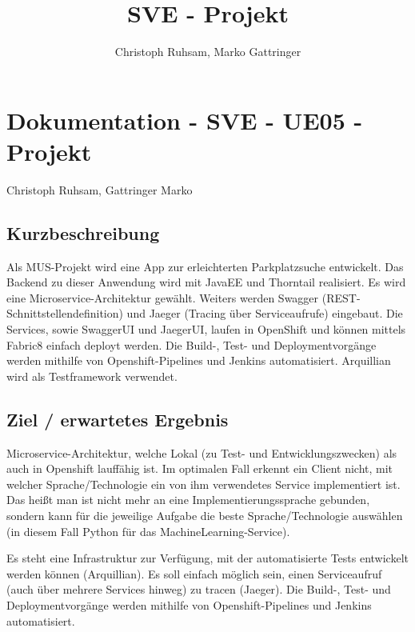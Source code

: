\documentclass[11pt, a4paper, twoside]{article}   	%
\title{SVE - Projekt}
\author{Christoph Ruhsam, Marko Gattringer}
\begin{document}
\setlength{\headheight}{15mm}

\section{Dokumentation - SVE - UE05 - Projekt}
Christoph Ruhsam, Gattringer Marko

\subsection{Kurzbeschreibung}
Als MUS-Projekt wird eine App zur erleichterten Parkplatzsuche entwickelt. Das Backend zu dieser 
Anwendung wird mit JavaEE und Thorntail realisiert. Es wird eine Microservice-Architektur gewählt. 
Weiters werden Swagger (REST-Schnittstellendefinition) und Jaeger (Tracing über Serviceaufrufe) eingebaut. 
Die Services, sowie SwaggerUI und JaegerUI, laufen in OpenShift und können mittels Fabric8 einfach deployt werden. 
Die Build-, Test- und Deploymentvorgänge werden mithilfe von Openshift-Pipelines und Jenkins automatisiert. 
Arquillian wird als Testframework verwendet.

\subsection{Ziel / erwartetes Ergebnis}
Microservice-Architektur, welche Lokal (zu Test- und Entwicklungszwecken) als auch in Openshift lauffähig ist. 
Im optimalen Fall erkennt ein Client nicht, mit welcher Sprache/Technologie ein von ihm verwendetes Service implementiert ist.
Das heißt man ist nicht mehr an eine Implementierungssprache gebunden, sondern kann für die jeweilige Aufgabe die beste 
Sprache/Technologie auswählen (in diesem Fall Python für das MachineLearning-Service).

Es steht eine Infrastruktur zur Verfügung, mit der automatisierte Tests entwickelt werden können (Arquillian).
Es soll einfach möglich sein, einen Serviceaufruf (auch über mehrere Services hinweg) zu tracen (Jaeger).
Die Build-, Test- und Deploymentvorgänge werden mithilfe von Openshift-Pipelines und Jenkins automatisiert.
\end{document}
